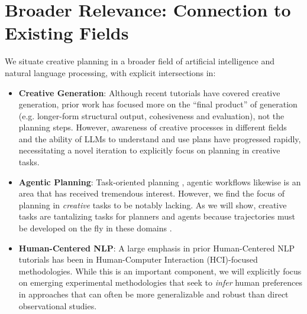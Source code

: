 \documentclass[11pt]{article}
\begin{document}
\section{Broader Relevance: Connection to Existing Fields}

We situate creative planning in a broader field of artificial intelligence and natural language processing, with explicit intersections in:

\begin{itemize}
    \item \textbf{Creative Generation}: Although recent tutorials \cite{chakrabarty-etal-2023-creative} have covered creative generation, prior work has focused more on the ``final product'' of generation (e.g. longer-form structural output, cohesiveness and evaluation), not the planning steps. However, awareness of creative processes in different fields and the ability of LLMs to understand and use plans have progressed rapidly, necessitating a novel iteration to explicitly focus on planning in creative tasks.
    \item \textbf{Agentic Planning}: Task-oriented planning \cite{yu-etal-2023-prompt, huang-etal-2024-planning, deng2024mind2web,zhang2024diversity,kohli2024cleared, xie2024travelplanner}, agentic workflows \cite{wangjarvis, wang2024agent,sodhi2024stepstackedllmpolicies, huang2024foodpuzzledevelopinglargelanguage,huang2025r2d2rememberingreflectingdynamic} likewise is an area that has received tremendous interest. However, we find the focus of planning in \textit{creative} tasks to be notably lacking. As we will show, creative tasks are tantalizing tasks for planners and agents because trajectories must be developed on the fly in these domains \cite{cote2018textworld, ALFRED20,ALFWorld20, tian2023macgyver}.
    \item \textbf{Human-Centered NLP}: A large emphasis in prior Human-Centered NLP tutorials \cite{yang-etal-2024-human} has been in Human-Computer Interaction (HCI)-focused methodologies. While this is an important component, we will explicitly focus on emerging experimental methodologies that seek to \textit{infer} human preferences in approaches that can often be more generalizable and robust than direct observational studies.
\end{itemize}
\end{document}
